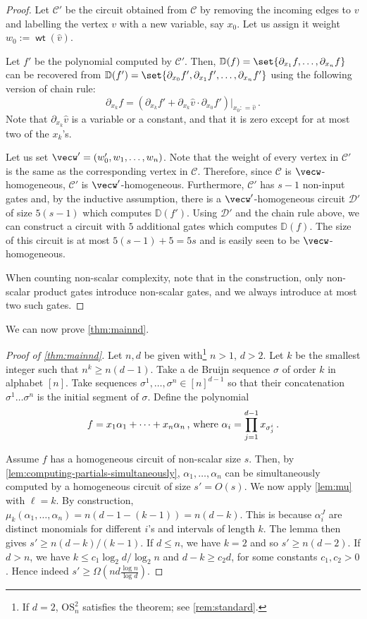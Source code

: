 \documentclass[11pt]{article}
\newcommand{\ckt}{\textbf{$\mathcal{C}$}}
\newcommand{\wt}{\operatorname{\mathsf{wt}}}
\newcommand{\esym}[2]{\mathrm{OS}_{#1}^{#2}}
\begin{document}
\begin{proof}
  Let $\ckt'$ be the circuit obtained from $\ckt$ by removing the incoming edges to $v$ and labelling the vertex $v$ with a new variable, say $x_0$. 
  Let us assign it weight $w_0:=\wt(\widehat {v})$.
  
  Let $f'$ be the polynomial computed by $\ckt'$.
  Then, $\mathbb{D}(f) = \set{\partial_{ x_1}f, \ldots, \partial_{ x_n}f}$ can be recovered from $\mathbb{D}(f') = \set{\partial_{ x_0}f', \partial_{ x_1}f', \ldots, \partial_{ x_n}f'}$ using the following version of chain rule:
  \[ 
    \partial_{x_k}f = (\partial_{x_k}f'+ \partial_{x_k}\widehat {v}\cdot  \partial_{x_0}f')|_{x_0: = \widehat {v}}\,. 
  \]
  Note that $\partial_{x_k}\widehat{v}$ is a variable or a constant, and that it is zero except for at most two of the $x_k$'s.

  Let us set $\vecw' = (w'_0, w_1, \ldots, w_n)$.
  Note that the weight of every vertex in $\ckt'$ is the same as the corresponding vertex in $\ckt$.
  Therefore, since $\ckt$ is $\vecw$-homogeneous, $\ckt'$ is $\vecw'$-homogeneous.
  Furthermore, $\ckt'$ has $s-1$ non-input gates and, by the inductive assumption, there is a $\vecw'$-homogeneous circuit $\mathcal{D}'$ of size $5(s-1)$ which computes $\mathbb{D}(f')$.
  Using $\mathcal{D}'$ and the chain rule above, we can construct a circuit with $5$ additional gates which computes $\mathbb{D}(f)$.
  The size of this circuit is at most $5(s-1) + 5 = 5s$ and is easily seen to be $\vecw$-homogeneous. 
  
  When counting non-scalar complexity, note that in the construction, only non-scalar product gates introduce non-scalar gates, and we always introduce at most two such gates.    
\end{proof}

We can now prove \autoref{thm:mainnd}. 

\begin{proof}[Proof of \autoref{thm:mainnd}] 
  Let $n,d$ be given with\footnote{If $d= 2$, $\esym{n}{2}$ satisfies the theorem; see \autoref{rem:standard}.} $n>1$, $d>2$. 
  Let $k$ be the smallest integer such that $n^k\geq n(d-1)$. Take a de Bruijn sequence $\sigma$ of order $k$ in alphabet $[n]$. 
  Take sequences $\sigma^1,\dots,\sigma^n\in [n]^{d-1}$ so that their concatenation $\sigma^1\dots \sigma^n$ is the initial segment of $\sigma$. 
  Define the polynomial 
  \[ 
    f= x_1\alpha_1+\dots+x_n\alpha_n\, \hbox{, where  }\alpha_i= \prod_{j=1}^{d-1}x_{\sigma^i_j} \,.
  \]

  Assume $f$ has a homogeneous circuit of non-scalar size $s$. 
  Then, by \autoref{lem:computing-partials-simultaneously}, $\alpha_1,\dots,\alpha_n$ can be simultaneously computed by a homogeneous circuit of size $s'=O(s)$. 
  We now apply \autoref{lem:mu} with $\ell=k$. 
  By construction, $\mu_k(\alpha_1,\dots, \alpha_n)= n(d-1- (k-1))=n(d-k)$. 
  This is because $\alpha_i^J$ are distinct monomials for different $i$'s and intervals of length $k$. 
  The lemma then gives $s'\geq n(d-k)/(k-1)$. 
  If $d\leq n$, we have $k=2$ and so $s'\geq n(d-2)$.  
  If $d>n$, we have $k\leq c_1 \log_2d/\log_2n$ and $d-k\geq c_2 d$, for some constants $c_1,c_2>0$.  
  Hence indeed $s'\geq \Omega(nd\frac{\log n }{\log d})$. 
\end{proof}
\end{document}
